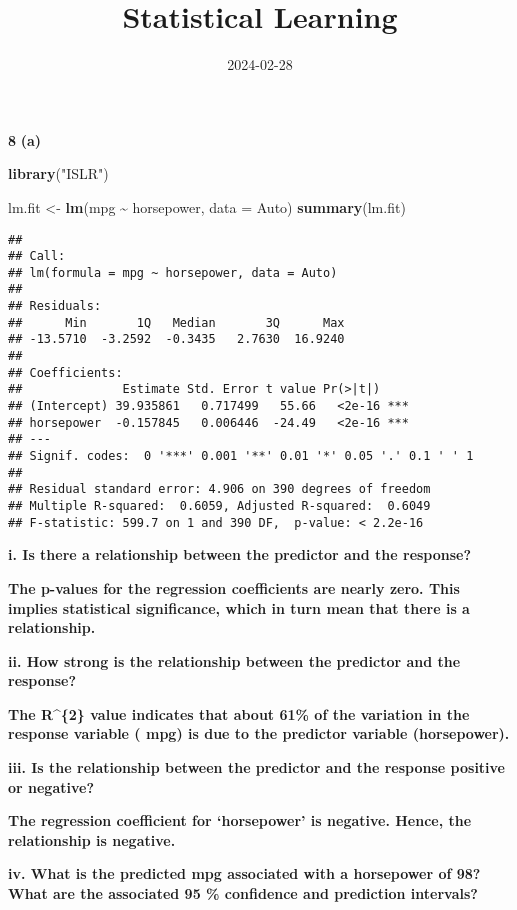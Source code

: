 \documentclass[
]{article}
\title{Statistical Learning}
\author{}
\date{\vspace{-2.5em}2024-02-28}
\newenvironment{Shaded}{\begin{snugshade}}{\end{snugshade}}
\newcommand{\AttributeTok}[1]{\textcolor[rgb]{0.13,0.29,0.53}{#1}}
\newcommand{\FunctionTok}[1]{\textcolor[rgb]{0.13,0.29,0.53}{\textbf{#1}}}
\newcommand{\NormalTok}[1]{#1}
\newcommand{\OtherTok}[1]{\textcolor[rgb]{0.56,0.35,0.01}{#1}}
\newcommand{\SpecialCharTok}[1]{\textcolor[rgb]{0.81,0.36,0.00}{\textbf{#1}}}
\newcommand{\StringTok}[1]{\textcolor[rgb]{0.31,0.60,0.02}{#1}}
\begin{document}
\maketitle

\textbf{8} \textbf{(a)}

\begin{Shaded}
\begin{Highlighting}[]
\FunctionTok{library}\NormalTok{(}\StringTok{"ISLR"}\NormalTok{)}

\NormalTok{lm.fit }\OtherTok{\textless{}{-}} \FunctionTok{lm}\NormalTok{(mpg }\SpecialCharTok{\textasciitilde{}}\NormalTok{ horsepower, }\AttributeTok{data =}\NormalTok{ Auto)}
\FunctionTok{summary}\NormalTok{(lm.fit)}
\end{Highlighting}
\end{Shaded}

\begin{verbatim}
## 
## Call:
## lm(formula = mpg ~ horsepower, data = Auto)
## 
## Residuals:
##      Min       1Q   Median       3Q      Max 
## -13.5710  -3.2592  -0.3435   2.7630  16.9240 
## 
## Coefficients:
##              Estimate Std. Error t value Pr(>|t|)    
## (Intercept) 39.935861   0.717499   55.66   <2e-16 ***
## horsepower  -0.157845   0.006446  -24.49   <2e-16 ***
## ---
## Signif. codes:  0 '***' 0.001 '**' 0.01 '*' 0.05 '.' 0.1 ' ' 1
## 
## Residual standard error: 4.906 on 390 degrees of freedom
## Multiple R-squared:  0.6059, Adjusted R-squared:  0.6049 
## F-statistic: 599.7 on 1 and 390 DF,  p-value: < 2.2e-16
\end{verbatim}

\textbf{i. Is there a relationship between the predictor and the
response?}

\textbf{The p-values for the regression coefficients are nearly zero.
This implies statistical significance, which in turn mean that there is
a relationship.}

\textbf{ii. How strong is the relationship between the predictor and the
response?}

\textbf{The R\^{}\{2\} value indicates that about 61\% of the variation
in the response variable ( mpg) is due to the predictor variable
(horsepower).}

\textbf{iii. Is the relationship between the predictor and the response
positive or negative?}

\textbf{The regression coefficient for `horsepower' is negative. Hence,
the relationship is negative.}

\textbf{iv. What is the predicted mpg associated with a horsepower of
98? What are the associated 95 \% confidence and prediction intervals?}
\end{document}

